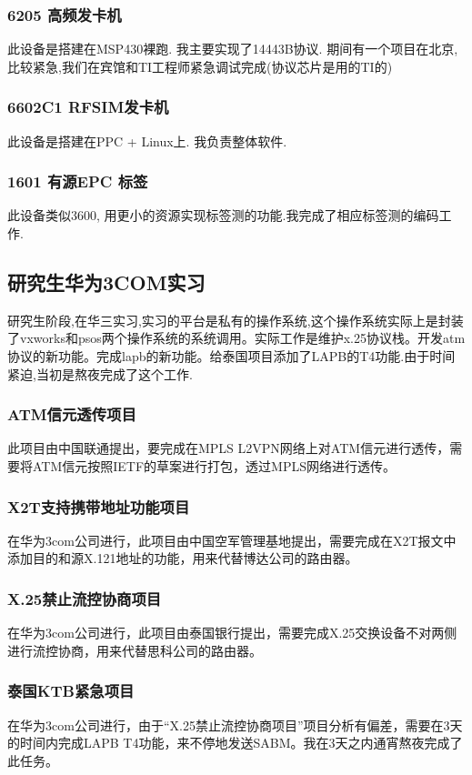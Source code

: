 \documentclass[titlepage]{article}
\begin{document}
\subsubsection{6205 高频发卡机}
此设备是搭建在MSP430裸跑. 我主要实现了14443B协议. 期间有一个项目在北京,比较紧急,我们在宾馆和TI工程师紧急调试完成(协议芯片是用的TI的)

\subsubsection{6602C1 RFSIM发卡机}
此设备是搭建在PPC + Linux上. 我负责整体软件. 

\subsubsection{1601 有源EPC 标签}
此设备类似3600, 用更小的资源实现标签测的功能.我完成了相应标签测的编码工作.



\subsection{研究生华为3COM实习}

研究生阶段,在华三实习,实习的平台是私有的操作系统,这个操作系统实际上是封装了vxworks和psos两个操作系统的系统调用。实际工作是维护x.25协议栈。开发atm协议的新功能。完成lapb的新功能。给泰国项目添加了LAPB的T4功能.由于时间紧迫,当初是熬夜完成了这个工作.

\subsubsection{ATM信元透传项目}
此项目由中国联通提出，要完成在MPLS L2VPN网络上对ATM信元进行透传，需要将ATM信元按照IETF的草案进行打包，透过MPLS网络进行透传。 

\subsubsection{X2T支持携带地址功能项目}
在华为3com公司进行，此项目由中国空军管理基地提出，需要完成在X2T报文中添加目的和源X.121地址的功能，用来代替博达公司的路由器。 

\subsubsection{X.25禁止流控协商项目}
在华为3com公司进行，此项目由泰国银行提出，需要完成X.25交换设备不对两侧进行流控协商，用来代替思科公司的路由器。 

\subsubsection{泰国KTB紧急项目}
在华为3com公司进行，由于“X.25禁止流控协商项目”项目分析有偏差，需要在3天的时间内完成LAPB T4功能，来不停地发送SABM。我在3天之内通宵熬夜完成了此任务。
\end{document}
